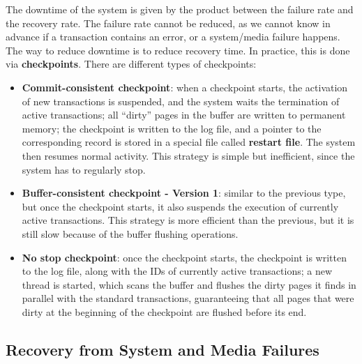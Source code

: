 The downtime of the system is given by the product between the failure rate and the recovery rate. The failure rate cannot be reduced, as we cannot know in advance if a transaction contains an error, or a system/media failure happens. The way to reduce downtime is to reduce recovery time. In practice, this is done via \textbf{checkpoints}. There are different types of checkpoints:
\begin{itemize}
    \item \textbf{Commit-consistent checkpoint}: when a checkpoint starts, the activation of new transactions is suspended, and the system waits the termination of active transactions; all ``dirty'' pages in the buffer are written to permanent memory; the checkpoint is written to the log file, and a pointer to the corresponding record is stored in a special file called \textbf{restart file}. The system then resumes normal activity. This strategy is simple but inefficient, since the system has to regularly stop.

    \item \textbf{Buffer-consistent checkpoint - Version 1}: similar to the previous type, but once the checkpoint starts, it also suspends the execution of currently active transactions. This strategy is more efficient than the previous, but it is still slow because of the buffer flushing operations.

    \item \textbf{No stop checkpoint}: once the checkpoint starts, the checkpoint is written to the log file, along with the IDs of currently active transactions; a new thread is started, which scans the buffer and flushes the dirty pages it finds in parallel with the standard transactions, guaranteeing that all pages that were dirty at the beginning of the checkpoint are flushed before its end.
\end{itemize}

\subsection{Recovery from System and Media Failures}

